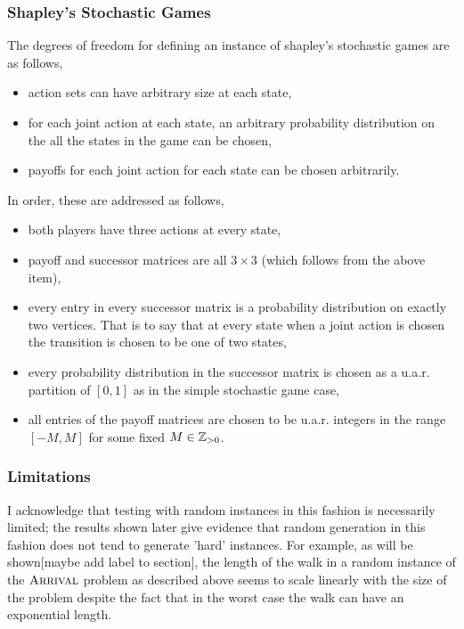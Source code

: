 \subsubsection{Shapley's Stochastic Games} \label{shapleyRandom}
The degrees of freedom for defining an instance of shapley's stochastic games are as follows,
\begin{itemize}
  \item action sets can have arbitrary size at each state,
  \item for each joint action at each state, an arbitrary probability distribution on the all
    the states in the game can be chosen,
  \item payoffs for each joint action for each state can be chosen arbitrarily.
\end{itemize}
In order, these are addressed as follows,
\begin{itemize}
  \item both players have three actions at every state,
  \item payoff and successor matrices are all $3 \times 3$ (which follows from the above item),
  \item every entry in every successor matrix is a probability distribution on exactly two vertices.
    That is to say that at every state when a joint action is chosen the transition is chosen
    to be one of two states,
  \item every probability distribution in the successor matrix is chosen as a u.a.r. partition of $[0, 1]$
    as in the simple stochastic game case,
  \item all entries of the payoff matrices are chosen to be u.a.r. integers in the range $[-M, M]$ for some
    fixed $M \in \mathbb{Z}_{> 0}$.
\end{itemize}
\subsubsection{Limitations}
I acknowledge that testing with random instances in this fashion is necessarily limited; the results
shown later give evidence that random generation in this fashion does not tend to generate 'hard' instances.
For example, as will be shown[maybe add label to section], the length of the walk in a random instance
of the $\textsc{Arrival}$ problem as described above seems to scale linearly with the size of the problem despite
the fact that in the worst case the walk can have an exponential length.

